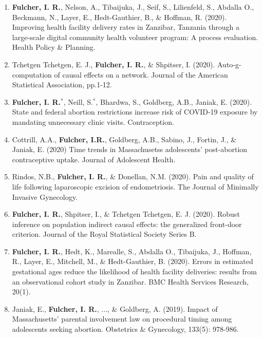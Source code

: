 \documentclass[12pt]{article}
\begin{document}
\begin{enumerate}

\setcounter{enumi}{0}

	\item \textbf{Fulcher, I. R.}, Nelson, A., Tibaijuka, J., Seif, S., Lilienfeld, S., Abdalla O., Beckmann, N., Layer, E., Hedt-Gauthier, B., \& Hoffman, R. (2020). Improving health facility delivery rates in Zanzibar, Tanzania through a large-scale digital community health volunteer program: A process evaluation. Health Policy \& Planning. 
	
	\item Tchetgen Tchetgen, E. J., \textbf{Fulcher, I. R.}, \& Shpitser, I. (2020). Auto-g-computation of causal effects on a network. Journal of the American Statistical Association, pp.1-12.
	
	\item \textbf{Fulcher, I. R.}$^{*}$, Neill, S.$^{*}$, Bhardwa, S., Goldberg, A.B., Janiak, E. (2020). State and federal abortion restrictions increase risk of COVID-19 exposure by mandating unnecessary clinic visits. Contraception. 
	
	\item Cottrill, A.A., \textbf{Fulcher, I.R.}, Goldberg, A.B., Sabino, J., Fortin, J., \& Janiak, E. (2020) Time trends in Massachusetss adolescents' post-abortion contraceptive uptake. Journal of Adolescent Health. 
	
	\item Rindos, N.B., \textbf{Fulcher, I. R.}, \& Donellan, N.M. (2020). Pain and quality of life following laparoscopic excision of endometriosis. The Journal of Minimally Invasive Gynecology. 
	
	\item \textbf{Fulcher, I. R.}, Shpitser, I., \& Tchetgen Tchetgen, E. J. (2020). Robust inference on population indirect causal effects: the generalized front-door criterion. Journal of the Royal Statistical Society Series B. 
	
	\item \textbf{Fulcher, I. R.}, Hedt, K., Marealle, S., Abdalla O., Tibaijuka, J., Hoffman, R., Layer, E., Mitchell, M., \& Hedt-Gauthier, B. (2020). Errors in estimated gestational ages reduce the likelihood of health facility deliveries: results from an observational cohort study in Zanzibar. BMC Health Services Research, 20(1).
	
	\item Janiak, E., \textbf{Fulcher, I. R.}, ..., \& Goldberg, A. (2019). Impact of Massachusetts' parental involvement law on procedural timing among adolescents seeking abortion. Obstetrics \& Gynecology, 133(5): 978-986.


\end{enumerate}
\end{document}
